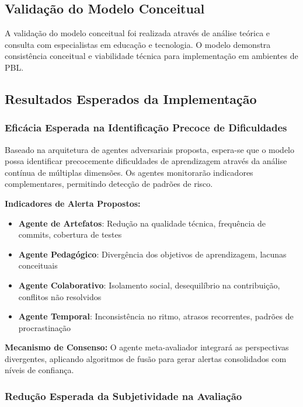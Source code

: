 \documentclass[english, spanish, brazilian]{modelo_dt}
\begin{document}
\subsection{Validação do Modelo Conceitual}

A validação do modelo conceitual foi realizada através de análise teórica e consulta com especialistas em educação e tecnologia\@. O modelo demonstra consistência conceitual e viabilidade técnica para implementação em ambientes de PBL\@.

\subsection{Resultados Esperados da Implementação}

\subsubsection{Eficácia Esperada na Identificação Precoce de Dificuldades}

Baseado na arquitetura de agentes adversariais proposta, espera-se que o modelo possa identificar precocemente dificuldades de aprendizagem através da análise contínua de múltiplas dimensões\@. Os agentes monitorarão indicadores complementares, permitindo detecção de padrões de risco\@.

\textbf{Indicadores de Alerta Propostos:}
\begin{itemize}
\item \textbf{Agente de Artefatos}: Redução na qualidade técnica, frequência de commits, cobertura de testes
\item \textbf{Agente Pedagógico}: Divergência dos objetivos de aprendizagem, lacunas conceituais
\item \textbf{Agente Colaborativo}: Isolamento social, desequilíbrio na contribuição, conflitos não resolvidos
\item \textbf{Agente Temporal}: Inconsistência no ritmo, atrasos recorrentes, padrões de procrastinação
\end{itemize}

\textbf{Mecanismo de Consenso:}
O agente meta-avaliador integrará as perspectivas divergentes, aplicando algoritmos de fusão para gerar alertas consolidados com níveis de confiança\@.

\subsubsection{Redução Esperada da Subjetividade na Avaliação}
\end{document}
